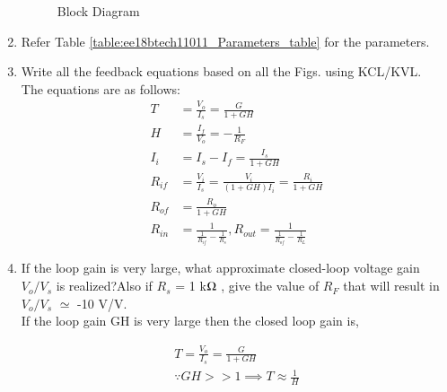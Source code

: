 \begin{enumerate}[label=\arabic*.,ref=\theenumi]
\begin{figure}[!ht]
	\begin{center}
			\resizebox{\columnwidth}{!}{}
	\end{center}
\caption{}
\label{fig:ee18btech11011_beta_circuit}
\end{figure}
%
\begin{figure}[!ht]
	\begin{center}
			\resizebox{\columnwidth}{!}{}
	\end{center}
\caption{Block Diagram}
\label{fig:Block Diagram}
\end{figure}
%
\item Refer Table \ref{table:ee18btech11011_Parameters_table} for the parameters.
%
\begin{table}[!ht]
\centering

\caption{}
\label{table:ee18btech11011_Parameters_table}
\end{table}
%
\item Write all the feedback equations based on all the Figs. using KCL/KVL.
\\
\solution The equations are as follows:
%
\begin{align}
\label{eq:ee18btech11011_Closed_loop_Gain1}
T &= \frac{V_{o}}{I_{s}} = \frac{G}{1+GH}\\
\label{eq:ee18btech11011_Feedback_Factor}
H &= \frac{I_{f}}{V_{o}} = -\frac{1}{R_F}\\
\label{eq:ee18btech11011_I_i}
I_{i} &= I_{s} - I_{f} = \frac{I_{s}}{1+GH}\\
\label{eq:ee18btech11011_R_if}
R_{i f} &= \frac{V_{i}}{I_{s}} = \frac{V_{i}}{(1+GH)I_{i}} =\frac{R_{i}}{1+GH}\\
\label{eq:ee18btech11011_R_of}
R_{o f} &= \frac{R_{o}}{1+GH}\\
\label{eq:ee18btech11011_R_in_and_R_out}
R_{i n} &= \frac{1}{\frac{1}{R_{i f}} - \frac{1}{R_{s}}} , R_{o u t} = \frac{1}{\frac{1}{R_{o f}} - \frac{1}{R_{L}}}
\end{align}
%
\item If the loop gain is very large, what approximate closed-loop voltage gain $V_{o}/V_{s}$ is realized?Also if $R_{s}$ = 1 k$\ohm$ , give the value of $R_{F}$ that will result in $V_{o}/V_{s}$ $\simeq$ -10 V/V.
\\
\solution If the loop gain GH is very large then the closed loop gain is,

\begin{align}
T = \frac{V_{o}}{I_{s}} = \frac{G}{1+GH}\\
\because GH >> 1 \implies T \approx \frac{1}{H}
\label{eq:ee18btech11011_Closed_Loop_Gain2}
\end{align}


\end{enumerate}
